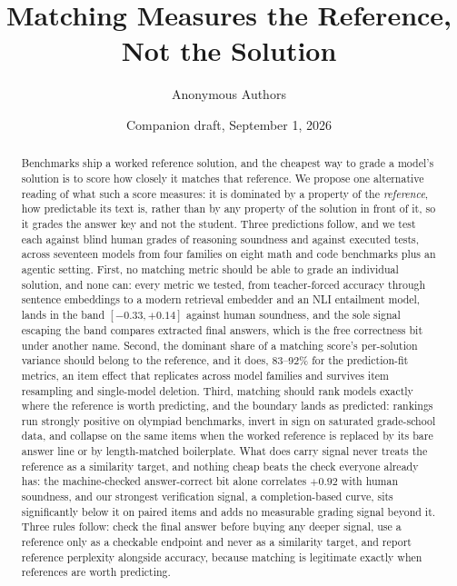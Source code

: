\documentclass[11pt]{article}
\title{Matching Measures the Reference, Not the Solution}
\author{Anonymous Authors}
\date{Companion draft, September 1, 2026}
\begin{document}
\maketitle

\begin{abstract}
\noindent
Benchmarks ship a worked reference solution, and the cheapest way to grade a model's solution is to score how closely it matches that reference.
We propose one alternative reading of what such a score measures: it is dominated by a property of the \emph{reference}, how predictable its text is, rather than by any property of the solution in front of it, so it grades the answer key and not the student.
Three predictions follow, and we test each against blind human grades of reasoning soundness and against executed tests, across seventeen models from four families on eight math and code benchmarks plus an agentic setting.
First, no matching metric should be able to grade an individual solution, and none can: every metric we tested, from teacher-forced accuracy through sentence embeddings to a modern retrieval embedder and an NLI entailment model, lands in the band $[-0.33, +0.14]$ against human soundness, and the sole signal escaping the band compares extracted final answers, which is the free correctness bit under another name.
Second, the dominant share of a matching score's per-solution variance should belong to the reference, and it does, $83$--$92\%$ for the prediction-fit metrics, an item effect that replicates across model families and survives item resampling and single-model deletion.
Third, matching should rank models exactly where the reference is worth predicting, and the boundary lands as predicted: rankings run strongly positive on olympiad benchmarks, invert in sign on saturated grade-school data, and collapse on the same items when the worked reference is replaced by its bare answer line or by length-matched boilerplate.
What does carry signal never treats the reference as a similarity target, and nothing cheap beats the check everyone already has: the machine-checked answer-correct bit alone correlates $+0.92$ with human soundness, and our strongest verification signal, a completion-based curve, sits significantly below it on paired items and adds no measurable grading signal beyond it.
Three rules follow: check the final answer before buying any deeper signal, use a reference only as a checkable endpoint and never as a similarity target, and report reference perplexity alongside accuracy, because matching is legitimate exactly when references are worth predicting.
\end{abstract}
\end{document}
